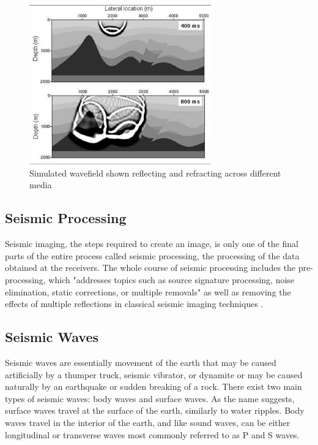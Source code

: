 \begin{figure}[ht]
	\centering
	\includegraphics[width=0.7\textwidth]{Images/reflectionrefraction.jpg}
	\caption{Simulated wavefield shown reflecting and refracting across different media}
	\label{fig:Wavefield-Reflection-And-Refraction}
\end{figure}

\subsection{Seismic Processing}

Seismic imaging, the steps required to create an image, is only one of the final parts of the entire process called seismic processing, the processing of the data obtained at the receivers. The whole course of seismic processing includes the pre-processing, which "addresses topics such as source signature processing, noise elimination, static corrections, or multiple removals" as well as removing the effects of multiple reflections in classical seismic imaging techniques \cite{EAGE}.

\subsection{Seismic Waves}

Seismic waves are essentially movement of the earth that may be caused artificially by a thumper truck, seismic vibrator, or dynamite or may be caused naturally by an earthquake or sudden breaking of a rock. There exist two main types of seismic waves: body waves and surface waves. As the name suggests, surface waves travel at the surface of the earth, similarly to water ripples. Body waves travel in the interior of the earth, and like sound waves, can be either longitudinal or transverse waves most commonly referred to as P and S waves.


